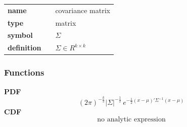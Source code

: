 \noindent\begin{tabular}{p{2cm}cl}
\textbf{name} & & covariance matrix \\
\textbf{type} & & matrix \\
\textbf{symbol} & & $\Sigma$  \\
\textbf{definition} & & $\Sigma \in R^{k\times k}$
\end{tabular}
\subsubsection*{Functions}

\smallskip \noindent \hspace{.2cm} \textbf{PDF} 
\begin{equation*}(2\pi)^{-\frac{k}{2}}|\Sigma|^{-\frac{1}{2}}\, e^{ -\frac{1}{2}(x-\mu)'\Sigma^{-1}(x-\mu) }\end{equation*}
\smallskip \noindent \hspace{.2cm} \textbf{CDF} 
\begin{equation*}\text{no analytic expression}\end{equation*}
%
%
% 
%
%
%
